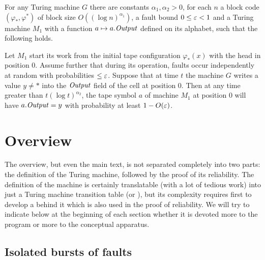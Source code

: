 \documentclass[11pt]{memoir}
\theoremstyle{definition} %
\renewcommand{\le}{\leq}
\newcommand{\fld}[1]{\ensuremath{\textit{#1\/}}}
\def\G{G} %
\newcommand{\Output}{\fld{Output}}
\begin{document}
\begin{theorem}\label{thm:main}
  For any Turing machine \( \G \) there are constants \( \alpha_{1},\alpha_{2}>0 \),
for each \( n \) a block code \( (\varphi_{*}, \varphi^{*}) \) of block size \( O((\log n)^{\alpha_{1}}) \),
a fault bound  \( 0\le\eps <1 \) and a Turing machine \( M_{1} \) with a 
function \( a\mapsto a.\Output \) defined on its alphabet,
such that the following holds.

Let \( M_{1} \) start its work from the initial tape configuration \( \varphi_{*}(x) \) with the head
in position 0.
Assume further that
during its operation, faults occur independently at random with probabilities \( \le \eps \).
Suppose that at time \( t \) the machine \( \G \) writes a value \( y\ne * \) 
into the \( \Output \) field of the cell at position 0.
Then at any time greater than \(    t(\log t)^{\alpha_{2}} \),
 the tape symbol \( a \) of machine \( M_{1} \) at position 0
 will have \( a.\Output= y \) with probability at least \( 1 - O(\varepsilon) \).
\end{theorem}


\section{Overview}

The overview, but even the main text, is not separated completely
into two parts: the definition of the Turing machine, followed by the proof of its reliability.
The definition of the machine is certainly translatable (with a lot of tedious work) into just a Turing
machine transition table (or ), but its complexity requires first to develop a  behind it which is also used in the proof of reliability.
We will try to indicate below at the beginning of each
section whether it is devoted more to the program or more to the conceptual apparatus.

\subsection{Isolated bursts of faults}\label{sec:bursts}
\end{document}
